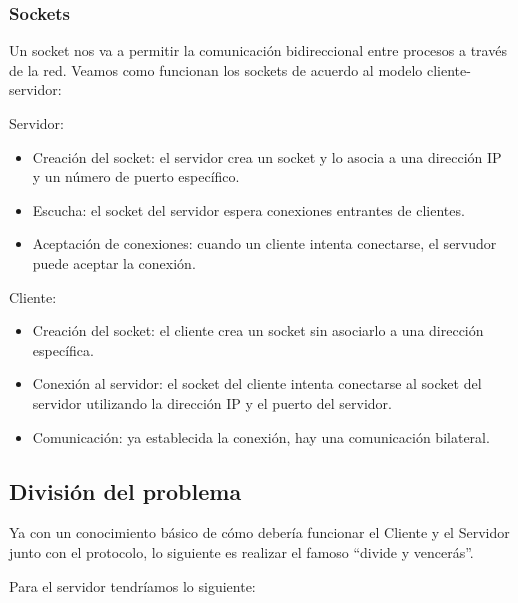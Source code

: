 \documentclass{article}
\begin{document}
\subsubsection{Sockets}
Un socket nos va a permitir la comunicación bidireccional entre procesos a través de la red. Veamos como funcionan los sockets de acuerdo al modelo cliente-servidor:

Servidor:
\begin{itemize}
  \item Creación del socket: el servidor crea un socket y lo asocia a una dirección IP y un número de puerto específico.
  \item Escucha: el socket del servidor espera conexiones entrantes de clientes.
  \item Aceptación de conexiones: cuando un cliente intenta conectarse, el servudor puede aceptar la conexión. 
\end{itemize}

Cliente:

\begin{itemize}
  \item Creación del socket: el cliente crea un socket sin asociarlo a una dirección específica.
  \item Conexión al servidor: el socket del cliente intenta conectarse al socket del servidor utilizando la dirección IP y el puerto del servidor.
  \item Comunicación: ya establecida la conexión, hay una comunicación bilateral. 
\end{itemize}

\subsection{División del problema}

Ya con un conocimiento básico de cómo debería funcionar el Cliente y el Servidor junto con el protocolo, lo siguiente es realizar el famoso ``divide y vencerás''. 

Para el servidor tendríamos lo siguiente:
\end{document}
